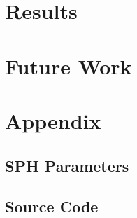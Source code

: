 \documentclass[letter,11pt]{article}
\begin{document}
\section{Results}


\section{Future Work}



%
%
%


\section{Appendix}
\subsection{SPH Parameters}
\subsection{Source Code}
\end{document}

